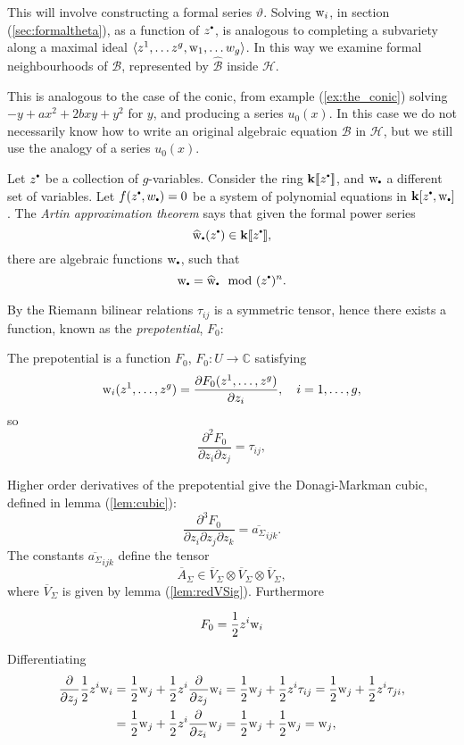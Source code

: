     This will involve constructing a formal series \( \vartheta\). Solving \( \mathrm{w}_i\), in section (\ref{sec:formaltheta}), as a function of \(z^{\sbt}\), is analogous to completing a subvariety along a maximal ideal \( \langle z^1, \dots z^g, \mathrm{w}_1, \dots w_g \rangle\). In this way we examine formal neighbourhoods of \( \mathcal{B}\), represented by \( \widehat{\mathcal{B}}\) inside \(\mathcal{H}\). 
    

    \begin{rem}This is analogous to the case of the conic, from example (\ref{ex:the_conic}) solving \(-y+ax^2 + 2b x y +y^2\) for \(y\), and producing a series \(u_0(x)\). In this case we do not necessarily know how to write an original algebraic equation \( \mathcal{B}\) in \( \mathcal{H}\), but we still use the analogy of a series \( u_0(x)\). 
    \end{rem}
    \begin{ex}
    Let \(z^{\sbt}\) be a collection of \(g\)-variables. Consider the ring \( \mathbf{k}\lBrack z^{\sbt} \rBrack\), and \( \w_{\sbt}\) a different set of variables. Let \(f(z^{\sbt}, w_{\sbt})= 0\) be a system of polynomial equations in \( \mathbf{k}[z^{\sbt},\w_{\sbt}] \). The \emph{Artin approximation theorem} says that given the formal power series 
    \[ \widehat{\w}_{\sbt}(z^{\sbt}) \in \mathbf{k}\lBrack z^{\sbt}\rBrack,\]
    there are algebraic functions \( \w_{\sbt}\), such that 
    \[ \w_{\sbt} = \widehat{\w}_{\sbt} \mod (z^{\sbt})^n .\]
    \end{ex}
    
    By the Riemann bilinear relations \(\tau_{ij}\) is a symmetric tensor, hence there exists a function, known as the {\em prepotential}, \(F_0\):
    \begin{defn}[Prepotential] The prepotential is a function \(F_0\),
    \(F_0:U\rightarrow \mathbb{C}\)
    satisfying
    \[\mathrm{w}_i(z^1, \dots,z^g) =\frac{\partial F_0(z^1,\dots,z^g)}{\partial z_i},\quad i=1,\dots,g,\]
    so
    \[ \frac{\partial^2 F_0}{\partial z_i\partial z_j}=\tau_{ij},\]
    \end{defn}
    Higher order derivatives of the prepotential give the Donagi-Markman cubic, defined in lemma (\ref{lem:cubic}):
    \[ 
    \frac{\partial^3 F_0}{\partial z_i\partial z_j\partial z_k}=\overline{a_\Sigma}_{ijk}.\]
    The constants \( \overline{a_\Sigma}_{ijk}\) define the tensor \[ \overline{A}_\Sigma\in\overline{V}_\Sigma\otimes\overline{V}_\Sigma\otimes\overline{V}_\Sigma,\]
    where \(\overline{V}_\Sigma\) is given by lemma (\ref{lem:redVSig}). Furthermore
    \begin{prop}
    \[F_0 = \frac{1}{2} z^i \mathrm{w}_i \]
    \end{prop}
    Differentiating
    \begin{align*}
    \frac{\partial}{\partial z_j}\frac12 z^i\mathrm{w}_i&=\frac12\mathrm{w}_j+\frac12 z^i\frac{\partial}{\partial z_j}\mathrm{w}_i
    =\frac12\mathrm{w}_j+\frac12 z^i\tau_{ij}=\frac12\mathrm{w}_j+\frac12 z^i\tau_{ji},\\
    &=\frac12\mathrm{w}_j+\frac12 z^i\frac{\partial}{\partial z_i}\mathrm{w}_j=\frac12\mathrm{w}_j+\frac12\mathrm{w}_j=\mathrm{w}_j,
    \end{align*}


